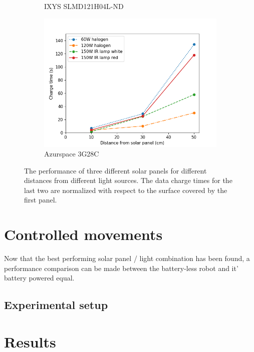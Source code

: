 \begin{figure}
\begin{subfigure}[b]{0.49\textwidth}
		\caption{IXYS SLMD121H04L-ND}
		\label{fig:light_exp2}
	\end{subfigure}
	\begin{subfigure}[b]{0.49\textwidth}
		\includegraphics[width=\textwidth]{pics/light_experiment_figure3.png}
		\caption{Azurspace 3G28C}
		\label{fig:light_exp3}
	\end{subfigure}
	\caption{The performance of three different solar panels for different distances from different light sources. The data charge times for the last two are normalized with respect to the surface covered by the first panel.}
\end{figure}

\section{Controlled movements}

Now that the best performing solar panel / light combination has been found, a performance comparison can be made between the battery-less robot and it' battery powered equal.

\subsection{Experimental setup}

\section{Results}





